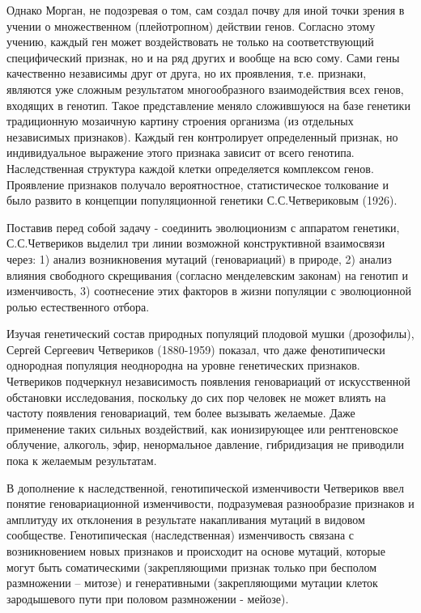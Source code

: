 \documentclass[exam_answers.tex]{subfiles}
\begin{document}
Однако Морган, не подозревая о том, сам создал почву для иной точки
зрения в учении о множественном (плейотропном) действии генов. Согласно
этому учению, каждый ген может воздействовать не только на
соответствующий специфический признак, но и на ряд других и вообще на всю
сому. Сами гены качественно независимы друг от друга, но их проявления, т.е.
признаки, являются уже сложным результатом многообразного взаимодействия
всех генов, входящих в генотип. Такое представление меняло сложившуюся на
базе генетики традиционную мозаичную картину строения организма (из
отдельных независимых признаков). Каждый ген контролирует определенный
признак, но индивидуальное выражение этого признака зависит от всего
генотипа. Наследственная структура каждой клетки определяется комплексом
генов. Проявление признаков получало вероятностное, статистическое
толкование и было развито в концепции популяционной генетики
С.С.Четвериковым (1926).

Поставив перед собой задачу - соединить эволюционизм с аппаратом
генетики, С.С.Четвериков выделил три линии возможной конструктивной
взаимосвязи через: 1) анализ возникновения мутаций (геновариаций) в природе,
2) анализ влияния свободного скрещивания (согласно менделевским законам)
на генотип и изменчивость, 3) соотнесение этих факторов в жизни популяции с
эволюционной ролью естественного отбора.

Изучая генетический состав природных популяций плодовой мушки
(дрозофилы), Сергей Сергеевич Четвериков (1880-1959) показал, что даже
фенотипически однородная популяция неоднородна на уровне генетических
признаков. Четвериков подчеркнул независимость появления геновариаций от
искусственной обстановки исследования, поскольку до сих пор человек не
может влиять на частоту появления геновариаций, тем более вызывать
желаемые. Даже применение таких сильных воздействий, как ионизирующее
или рентгеновское облучение, алкоголь, эфир, ненормальное давление,
гибридизация не приводили пока к желаемым результатам.

В дополнение к наследственной, генотипической изменчивости
Четвериков ввел понятие геновариационной изменчивости, подразумевая
разнообразие признаков и амплитуду их отклонения в результате накапливания
мутаций в видовом сообществе. Генотипическая (наследственная)
изменчивость связана с возникновением новых признаков и происходит на
основе мутаций, которые могут быть соматическими (закрепляющими признак
только при бесполом размножении – митозе) и генеративными
(закрепляющими мутации клеток зародышевого пути при половом
размножении - мейозе).
\end{document}

